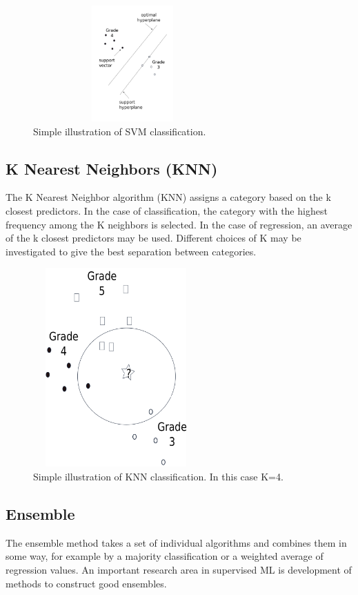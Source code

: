\documentclass{SBCbookchapter}
\begin{document}
\begin{figure}[!htpb]
	\centering
	\includegraphics[width=3in,height=1.75in]{SimpleSVM.png}
	\caption{Simple illustration of SVM classification.}
	\label{SimpleSVM}
\end{figure}

\subsection{K Nearest Neighbors (KNN)}
The K Nearest Neighbor algorithm (KNN) assigns a category based on the k closest predictors. In the case of classification, the category with the highest frequency among the K neighbors is selected. In the case of regression, an average of the k closest predictors may be used. Different choices of K may be investigated to give the best separation between categories.


\begin{figure}[!htpb]
	\centering
	\includegraphics[width=2.5in,height=3in]{SimpleKNN.png}
	\caption{Simple illustration of KNN classification. In this case K=4.}
	\label{SimpleSVM}
\end{figure}

\subsection{Ensemble}
The ensemble method \cite{Diet} takes a set of individual algorithms and combines them in some way, for example by a majority classification or a weighted average of regression values.  An important research area in supervised ML is development of methods to construct good ensembles.
\end{document}
